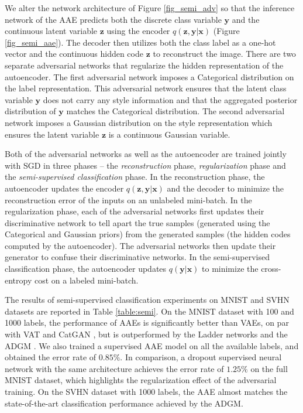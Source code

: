 \documentclass{article}
\begin{document}
We alter the network architecture of Figure \ref{fig_semi_adv} so that the inference network of the AAE predicts both the discrete class variable $\mathbf{y}$ and the continuous latent variable $\mathbf{z}$ using the encoder $q(\mathbf{z},\mathbf{y}|\mathbf{x})$ (Figure \ref{fig_semi_aae}). The decoder then utilizes both the class label as a one-hot vector and the continuous hidden code $\mathbf{z}$ to reconstruct the image. There are two separate adversarial networks that regularize the hidden representation of the autoencoder. The first adversarial network imposes a Categorical distribution on the label representation. This adversarial network ensures that the latent class variable $\mathbf{y}$ does not carry any style information and that the aggregated posterior distribution of $\mathbf{y}$ matches the Categorical distribution. The second adversarial network imposes a Gaussian distribution on the style representation which ensures the latent variable $\mathbf{z}$ is a continuous Gaussian variable.

Both of the adversarial networks as well as the autoencoder are trained jointly with SGD in three phases -- the \emph{reconstruction} phase, \emph{regularization} phase and the \emph{semi-supervised classification} phase. In the reconstruction phase, the autoencoder updates the encoder $q(\mathbf{z},\mathbf{y}|\mathbf{x})$ and the decoder to minimize the reconstruction error of the inputs on an unlabeled mini-batch. In the regularization phase, each of the adversarial networks first updates their discriminative network to tell apart the true samples (generated using the Categorical and Gaussian priors) from the generated samples (the hidden codes computed by the autoencoder). The adversarial networks then update their generator to confuse their discriminative networks. In the semi-supervised classification phase, the autoencoder updates $q(\mathbf{y}|\mathbf{x})$ to minimize the cross-entropy cost on a labeled mini-batch. 



The results of semi-supervised classification experiments on MNIST and SVHN datasets are reported in Table \ref{table:semi}. On the MNIST dataset with 100 and 1000 labels, the performance of AAEs is significantly better than VAEs, on par with VAT \citep{vat} and CatGAN \citep{catgan}, but is outperformed by the Ladder networks \citep{ladder} and the ADGM \citep{adgm}. We also trained a supervised AAE model on all the available labels, and obtained the error rate of $0.85\%$. In comparison, a dropout supervised neural network with the same architecture achieves the error rate of $1.25\%$ on the full MNIST dataset, which highlights the regularization effect of the adversarial training. On the SVHN dataset with 1000 labels, the AAE almost matches the state-of-the-art classification performance achieved by the ADGM. 
\end{document}
